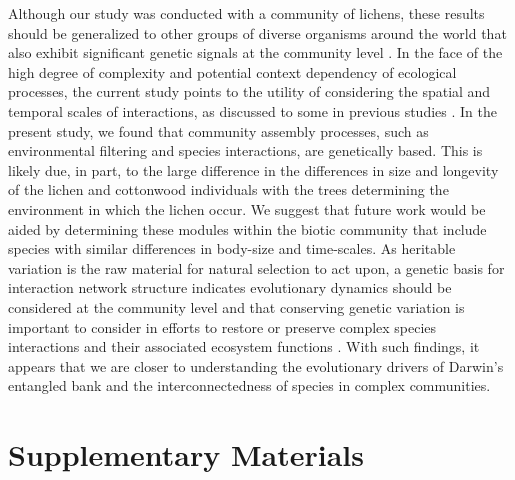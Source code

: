 \documentclass[9pt,twocolumn,twoside,lineno]{pnas-new}
\begin{document}
Although our study was conducted with a community of lichens, these
results should be generalized to other groups of diverse organisms
around the world that also exhibit significant genetic signals at the
community level \cite{Rowntree2011, Whitham2012}. In the face of the
high degree of complexity and potential context dependency of
ecological processes, the current study points to the utility of
considering the spatial and temporal scales of interactions, as
discussed to some in previous studies \cite{Bangert2006, Zook2010,
  Zytynska2012}. In the present study, we found that community
assembly processes, such as environmental filtering and species
interactions, are genetically based. This is likely due, in part, to
the large difference in the differences in size and longevity of the
lichen and cottonwood individuals with the trees determining the
environment in which the lichen occur. We suggest that future work
would be aided by determining these modules within the biotic
community that include species with similar differences in body-size
and time-scales. As heritable variation is the raw material for
natural selection to act upon, a genetic basis for interaction network
structure indicates evolutionary dynamics should be considered at the
community level and that conserving genetic variation is important to
consider in efforts to restore or preserve complex species
interactions and their associated ecosystem functions
\cite{Evans2013}.  With such findings, it appears that we are closer
to understanding the evolutionary drivers of Darwin's entangled bank
and the interconnectedness of species in complex communities.




\showacknow{} %



\newpage

\section*{Supplementary Materials}
\end{document}
